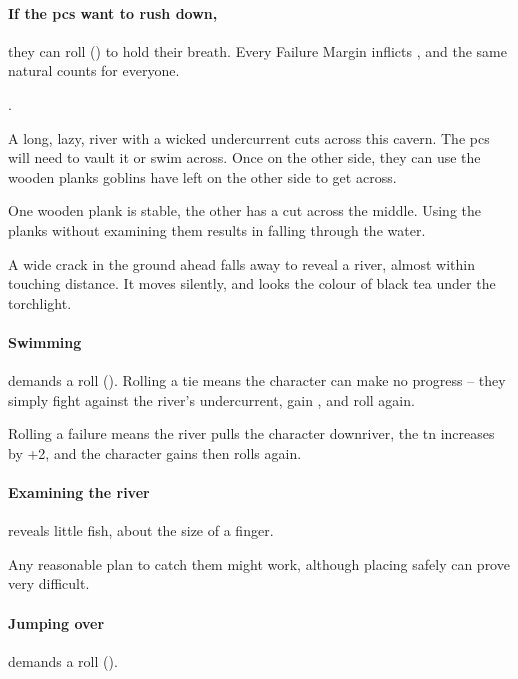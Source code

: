 \begin{multicols}{2}
\paragraph{If the \glspl{pc} want to rush down,}
they can roll  (\tn[10]) to hold their breath.
Every Failure Margin inflicts , and the same \gls{natural} counts for everyone.

.


A long, lazy, river with a wicked undercurrent cuts across this cavern.
The \glspl{pc} will need to vault it or swim across.
Once on the other side, they can use the wooden planks goblins have left on the other side to get across.

One wooden plank is stable, the other has a cut across the middle.
Using the planks without examining them results in  falling through the water.

\begin{boxtext}
  A wide crack in the ground ahead falls away to reveal a river, almost within touching distance.
  It moves silently, and looks the colour of black tea under the torchlight.
\end{boxtext}

\paragraph{Swimming}
demands a  roll (\tn[10]).
Rolling a tie means the character can make no progress -- they simply fight against the river's undercurrent, gain , and roll again.

Rolling a failure means the river pulls the character downriver, the \gls{tn} increases by +2, and the character gains  then rolls again.

\paragraph{Examining the river}
reveals little fish, about the size of a finger.

Any reasonable plan to catch them might work, although placing  safely can prove very difficult.

\paragraph{Jumping over}
demands a  roll (\tn[12]).


\end{multicols}
